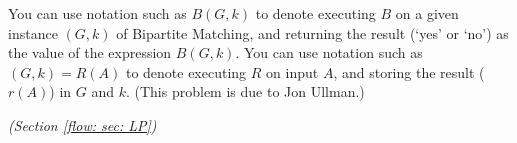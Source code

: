 \documentclass[11pt]{article}
\begin{document}
\begin{enumerate}[label=(\alph*)]
  You can use notation such as $B(G, k)$ to denote executing $B$ on a given instance $(G, k)$ of Bipartite Matching,
  and returning the result (`yes' or `no') as the value of the expression $B(G, k)$.
  You can use notation such as $(G, k) = R(A)$ to denote executing $R$ on input $A$,
  and storing the result ($r(A)$) in $G$ and $k$. (This problem is due to Jon Ullman.)
\end{enumerate}


\vfill

{}

\newpage




\problem\emph{(Section \ref{flow: sec: LP})} 
\end{document}
